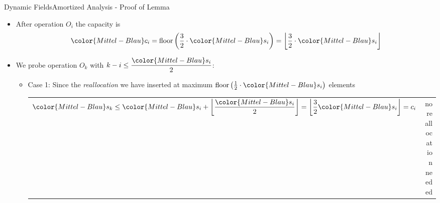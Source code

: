 \begin{frame}{Dynamic Fields}{Amortized Analysis - Proof of Lemma}
  \begin{itemize}
    \item
      After operation {\color{Mittel-Blau}$O_i$} the capacity is
      \[
        {\color{Mittel-Blau}c_i}
        = \mathrm{floor}\left(\frac{3}{2}\cdot{\color{Mittel-Blau}s_i}\right)
        = \left\lfloor \frac{3}{2}\cdot{\color{Mittel-Blau}s_i} \right\rfloor
      \]
    \item
      We probe operation {\color{Mittel-Blau}$O_k$} with
      $k -i \leq \dfrac{\color{Mittel-Blau}s_i}{2}$:
      \begin{itemize}
        \item
          Case 1: Since the \textit{reallocation} we have inserted at
          maximum
          $\mathrm{floor}\left(
            \frac{1}{2} \cdot {\color{Mittel-Blau}s_i}
          \right)$ elements
          \vspace{0.5em}\\
          \begin{tabularx}{\linewidth}{Xr}
            ${\color{Mittel-Blau}s_k}
              \leq {\color{Mittel-Blau}s_i} +
                \left\lfloor
                  \dfrac{\color{Mittel-Blau}s_i}{2}
                  \vphantom{\dfrac{3}{2}}
                \right\rfloor
              = \left\lfloor\dfrac{3}{2} {\color{Mittel-Blau}s_i}\right\rfloor
              = c_i$ &
              {\color{Mittel-Blau}no reallocation needed}
          \end{tabularx}
      \end{itemize}
  \end{itemize}
\end{frame}


